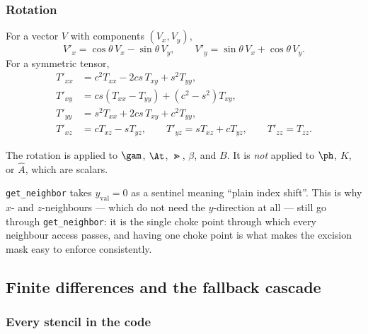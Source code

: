 \label{sec:cartoon}
\subsubsection{Rotation}

For a vector $V$ with components $(V_x, V_y)$,
\begin{equation}
V'_x = \cos\theta\, V_x - \sin\theta\, V_y,\qquad
V'_y = \sin\theta\, V_x + \cos\theta\, V_y.
\end{equation}
For a symmetric tensor,
\begin{align}
T'_{xx} &= c^2T_{xx} - 2cs\,T_{xy} + s^2T_{yy}, \\
T'_{xy} &= cs(T_{xx}-T_{yy}) + (c^2-s^2)T_{xy}, \\
T'_{yy} &= s^2T_{xx} + 2cs\,T_{xy} + c^2T_{yy}, \\
T'_{xz} &= cT_{xz} - sT_{yz},\qquad
T'_{yz} = sT_{xz} + cT_{yz},\qquad T'_{zz} = T_{zz}.
\end{align}

The rotation is applied to $\gam$, $\At$, $\Gt$, $\beta$, and $B$. It is
\emph{not} applied to $\ph$, $K$, or $\hat{A}$, which are scalars.

\gotcha
\texttt{get\_neighbor} takes $y_{\mathrm{val}} = 0$ as a sentinel meaning
``plain index shift''. This is why $x$- and $z$-neighbours --- which do not need
the $y$-direction at all --- still go through \texttt{get\_neighbor}: it is
the single choke point through which every neighbour access passes, and having
one choke point is what makes the excision mask easy to enforce consistently.

\subsection{Finite differences and the fallback cascade}

\label{sec:stencils}
\subsubsection{Every stencil in the code}

